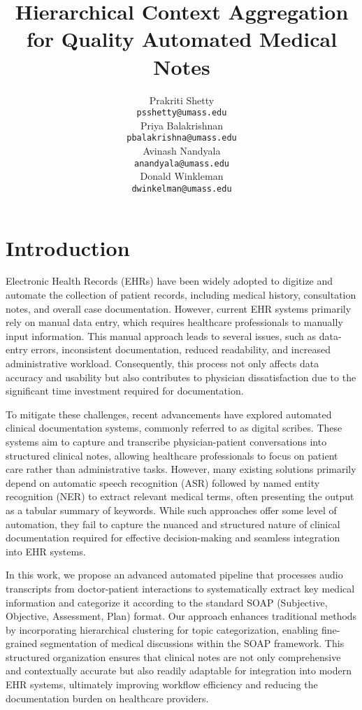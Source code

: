 \documentclass[11pt,a4paper]{article}
\title{Hierarchical Context Aggregation for Quality Automated Medical Notes}
\author{Prakriti Shetty \\
  {\tt \small psshetty@umass.edu} \\\And
  Priya Balakrishnan \\
  {\tt \small pbalakrishna@umass.edu} \\\And
  Avinash Nandyala \\
  {\tt \small anandyala@umass.edu} \\\And
  Donald Winkleman \\
  {\tt \small dwinkelman@umass.edu} \\}
\date{}
\begin{document}
\maketitle

\section{Introduction}
Electronic Health Records (EHRs) have been widely adopted to digitize and automate the collection of patient records, including medical history, consultation notes, and overall case documentation. However, current EHR systems primarily rely on manual data entry, which requires healthcare professionals to manually input information. This manual approach leads to several issues, such as data-entry errors, inconsistent documentation, reduced readability, and increased administrative workload. Consequently, this process not only affects data accuracy and usability but also contributes to physician dissatisfaction due to the significant time investment required for documentation. 

To mitigate these challenges, recent advancements have explored automated clinical documentation systems, commonly referred to as digital scribes. These systems aim to capture and transcribe physician-patient conversations into structured clinical notes, allowing healthcare professionals to focus on patient care rather than administrative tasks. However, many existing solutions primarily depend on automatic speech recognition (ASR) followed by named entity recognition (NER) to extract relevant medical terms, often presenting the output as a tabular summary of keywords. While such approaches offer some level of automation, they fail to capture the nuanced and structured nature of clinical documentation required for effective decision-making and seamless integration into EHR systems.

In this work, we propose an advanced automated pipeline that processes audio transcripts from doctor-patient interactions to systematically extract key medical information and categorize it according to the standard SOAP (Subjective, Objective, Assessment, Plan) format. Our approach enhances traditional methods by incorporating hierarchical clustering for topic categorization, enabling fine-grained segmentation of medical discussions within the SOAP framework. This structured organization ensures that clinical notes are not only comprehensive and contextually accurate but also readily adaptable for integration into modern EHR systems, ultimately improving workflow efficiency and reducing the documentation burden on healthcare providers.
\end{document}
